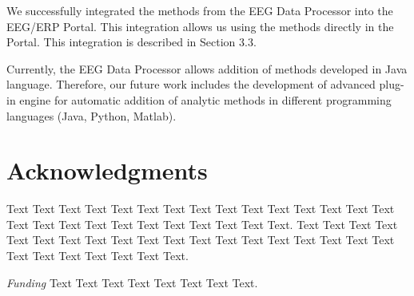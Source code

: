 \documentclass{frontiersSCNS} %
\begin{document}
We successfully integrated the methods from the EEG Data Processor into the EEG/ERP Portal. This integration allows us using the methods directly in the Portal. This integration is described in Section 3.3.

Currently, the EEG Data Processor allows addition of methods developed in Java language. Therefore, our future work includes the development of advanced plug-in engine for automatic addition of analytic methods in different programming languages (Java, Python, Matlab).

\section*{Acknowledgments}
Text Text Text Text Text Text  Text Text Text Text Text Text Text Text  Text Text Text Text Text Text Text Text Text  Text Text Text. Text Text Text Text Text Text  Text Text Text Text Text Text Text Text  Text Text Text Text Text Text Text Text Text  Text Text Text. 


\textit{Funding\textcolon} Text Text Text Text Text Text  Text Text.













\end{document}

